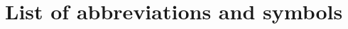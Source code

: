 \documentclass[12pt,a4paper,english]{tutthesis}
\begin{document}
\renewcommand\contentsname{Table of Contents} %
\setcounter{tocdepth}{3}                      %

\tableofcontents                              %

\renewcommand\listfigurename{List of Figures}  %
\listoffigures                                 %
\markboth{}{}                                  %

\renewcommand\listtablename{List of Tables}    %
\listoftables                                  %
\markboth{}{}                                  %


\lstlistoflistings                                %


%
%

\chapter*{List of abbreviations and symbols}
\markboth{}{}                                %
\end{document}
